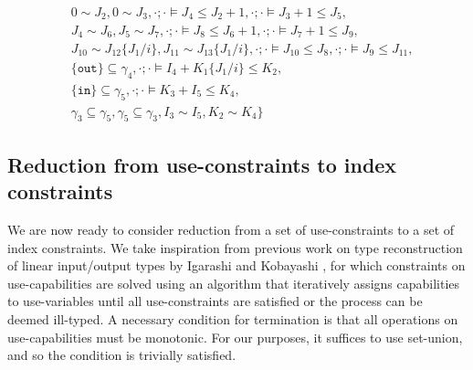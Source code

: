 \begin{example}
\begin{align*}
    & 0 \sim J_2, 0 \sim J_3,
    \cdot;\cdot\vDash J_4 \leq J_2+1, \cdot;\cdot\vDash J_3+1 \leq J_5 ,\\
    & J_4 \sim J_6, J_5 \sim J_7,
    \cdot;\cdot\vDash J_8 \leq J_6+1,\cdot;\cdot\vDash J_7+1 \leq J_9,\\
    & J_{10} \sim J_{12}\{J_1/i\}, J_{11} \sim J_{13}\{J_1/i\},
    \cdot;\cdot\vDash J_{10} \leq J_8, \cdot;\cdot\vDash J_9 \leq J_{11} , \\
    & \{\texttt{out}\} \subseteq \gamma_4,
    \cdot;\cdot\vDash I_4 + K_1\{J_1/i\} \leq K_2,\\
    & \{\texttt{in}\} \subseteq \gamma_5,\cdot;\cdot\vDash K_3 + I_5 \leq K_4,\\
    & \gamma_3 \subseteq \gamma_5, \gamma_5 \subseteq \gamma_3, I_3 \sim I_5,K_2 \sim K_4\}
\end{align*}
\end{example}
%
\subsection{Reduction from use-constraints to index constraints}

We are now ready to consider reduction from a set of use-constraints to a set of index constraints. We take inspiration from previous work on type reconstruction of linear input/output types by Igarashi and Kobayashi \cite{IgarashiKobayashi2000}, for which constraints on use-capabilities are solved using an algorithm that iteratively assigns capabilities to use-variables until all use-constraints are satisfied or the process can be deemed ill-typed. A necessary condition for termination is that all operations on use-capabilities must be monotonic. For our purposes, it suffices to use set-union, and so the condition is trivially satisfied.\\

